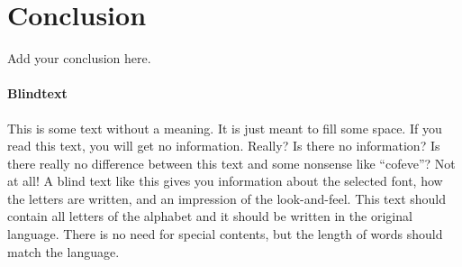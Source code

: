 \section{Conclusion} \label{conclusion}

Add your conclusion here.

\paragraph{Blindtext} This is some text without a meaning. It is just meant to fill some space. If you read this text, you will get no information. Really? Is there no information? Is there really no difference between this text and some nonsense like ``cofeve''? Not at all! A blind text like this gives you information about the selected font, how the letters are written, and an impression of the look-and-feel. This text should contain all letters of the alphabet and it should be written in the original language. There is no need for special contents, but the length of words should match the language.
